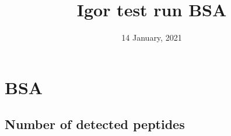 \documentclass[]{article}
\title{Igor test run BSA}
\author{}
\date{\vspace{-2.5em}14 January, 2021}
\begin{document}
\maketitle

{
\setcounter{tocdepth}{2}
\tableofcontents
}
\hypertarget{bsa}{%
\section{BSA}\label{bsa}}

\hypertarget{number-of-detected-peptides}{%
\subsection{Number of detected peptides}\label{number-of-detected-peptides}}

\begin{table}


\end{table}
\end{document}
